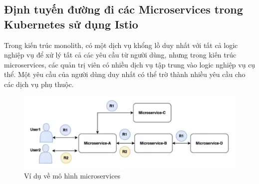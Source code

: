 \documentclass[14pt,a4paper]{book}
\begin{document}
		\subsection{Định tuyến đường đi các Microservices trong Kubernetes sử dụng Istio}
			\hspace{0.6cm} Trong kiến trúc monolith, có một dịch vụ khổng lồ duy nhất với tất cả logic nghiệp vụ để xử lý tất cả các yêu cầu từ người dùng, nhưng trong kiến trúc microservices, các quản trị viên có nhiều dịch vụ tập trung vào logic nghiệp vụ cụ thể. Một yêu cầu của người dùng duy nhất có thể trờ thành nhiều yêu cầu cho các dịch vụ phụ thuộc.
			
			\begin{figure}[h!]
				\centering
				\includegraphics[width=0.9\linewidth]{Pics/2.2.2-p4}
				\caption{Ví dụ về mô hình microservices}
				\label{fig:2}
			\end{figure}
		
\end{document}

